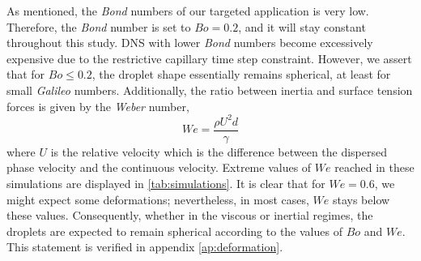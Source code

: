 As mentioned, the \textit{Bond} numbers of our targeted application is very low.
Therefore, the \textit{Bond} number is set to $Bo = 0.2$, and it will stay constant throughout this study.
DNS with lower \textit{Bond} numbers become excessively expensive due to the restrictive capillary time step constraint. 
However, we assert that for $Bo \leq 0.2$, the droplet shape essentially remains spherical, at least for small \textit{Galileo} numbers. 
Additionally, the ratio between inertia and surface tension forces is given by the \textit{Weber} number, 
\begin{equation*}
    We = \frac{\rho U^2d}{\gamma}%
\end{equation*}
where $U$ is the relative velocity which is the difference between the dispersed phase velocity and the continuous velocity.%
Extreme values of $We$ reached in these simulations are displayed in \ref{tab:simulations}. 
It is clear that for $We=0.6$, we might expect some deformations; nevertheless, in most cases, $We$ stays below these values. 
Consequently, whether in the viscous or inertial regimes, the droplets are expected to remain spherical according to the values of $Bo$ and $We$.
This statement is verified in appendix \ref{ap:deformation}.%



